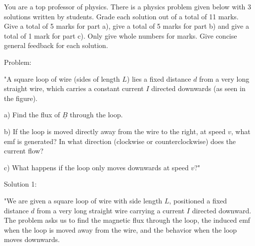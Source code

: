 You are a top professor of physics. There is a physics problem given below with 3 solutions written by students. Grade each solution out of a total of 11 marks. Give a total of 5 marks for part a), give a total of 5 marks for part b) and give a total of 1 mark for part c). Only give whole numbers for marks. Give concise general feedback for each solution. 

Problem:

"A square loop of wire (sides of length \( L \)) lies a fixed distance \( d \) from a very long straight wire, which carries a constant current \( I \) directed downwards (as seen in the figure).

a) Find the flux of \( \underline{B} \) through the loop.

b) If the loop is moved directly away from the wire to the right, at speed \( v \), what emf is generated? In what direction (clockwise or counterclockwise) does the current flow?

c) What happens if the loop only moves downwards at speed \( v \)?"

Solution 1: 

"We are given a square loop of wire with side length $L$, positioned a fixed distance $d$ from a very long straight wire carrying a current $I$ directed downward. The problem asks us to find the magnetic flux through the loop, the induced emf when the loop is moved away from the wire, and the behavior when the loop moves downwards.

